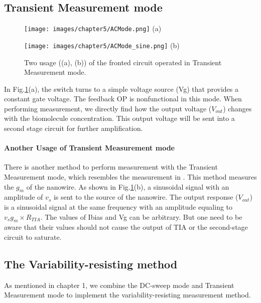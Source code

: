 \subsection{Transient Measurement mode} \label{sec:TrM}

\begin{figure}[!htbp]
    \centering
    \begin{minipage}[t]{0.4\textwidth}
        \texttt{[image: images/chapter5/ACMode.png]}
        \raggedleft
        (a)
    \end{minipage}
    \hfill
    \begin{minipage}[t]{0.4\textwidth}
        \texttt{[image: images/chapter5/ACMode\_sine.png]}
        \raggedleft
        (b)
    \end{minipage}
    \caption{Two usage ((a), (b)) of the fronted circuit operated in Transient Measurement mode.}
    \label{fig:ACmode}
\end{figure}

In Fig.\ref{fig:ACmode}(a), the switch turns to a simple voltage source (Vg) that provides a constant gate voltage.
The feedback OP is nonfunctional in this mode.
When performing measurement, we directly find how the output voltage ($V_{out}$) changes with the biomolecule concentration.
This output voltage will be sent into a second stage circuit for further amplification.

\paragraph*{Another Usage of Transient Measurement mode}
There is another method to perform measurement with the Transient Measurement mode, which resembles the measurement in \cite{Jlockin}.
This method measures the $g_m$ of the nanowire.
As shown in Fig.\ref{fig:ACmode}(b), a sinusoidal signal with an amplitude of $v_s$ is sent to the source of the nanowire.
The output response ($V_{out}$) is a sinusoidal signal at the same frequency with an amplitude equaling to $v_sg_m \times R_{TIA}$.
The values of Ibias and Vg can be arbitrary.
But one need to be aware that their values should not cause the output of TIA or the second-stage circuit to saturate.

\subsection{The Variability-resisting method}
As mentioned in chapter 1, we combine the DC-sweep mode and Transient Measurement mode to implement the variability-resisting measurement method.

